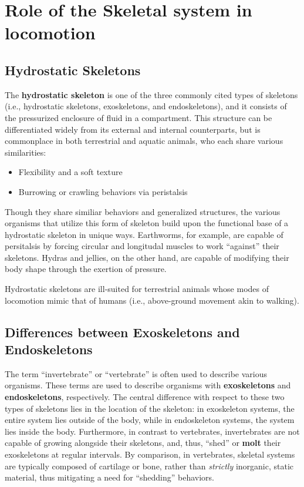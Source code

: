 \documentclass{article}
\begin{document}
\section{Role of the Skeletal system in locomotion}

\subsection{Hydrostatic Skeletons}

The \textbf{hydrostatic skeleton} is one of the three commonly cited types of
skeletons (i.e., hydrostatic skeletons, exoskeletons, and endoskeletons), and it
consists of the pressurized enclosure of fluid in a compartment. This structure
can be differentiated widely from its external and internal counterparts, but is
commonplace in both terrestrial and aquatic animals, who each share various
similarities:

\begin{itemize}
    \item Flexibility and a soft texture
    \item Burrowing or crawling behaviors via peristalsis
\end{itemize}

Though they share similiar behaviors and generalized structures, the various
organisms that utilize this form of skeleton build upon the functional base of
a hydrostatic skeleton in unique ways. Earthworms, for example, are capable of
persitalsis by forcing circular and longitudal muscles to work ``against'' their
skeletons. Hydras and jellies, on the other hand, are capable of modifying their
body shape through the exertion of pressure.

Hydrostatic skeletons are ill-suited for terrestrial animals whose modes of
locomotion mimic that of humans (i.e., above-ground movement akin to walking).

\subsection{Differences between Exoskeletons and Endoskeletons}

The term ``invertebrate'' or ``vertebrate'' is often used to describe various
organisms. These terms are used to describe organisms with \textbf{exoskeletons}
and \textbf{endoskeletons}, respectively. The central difference with respect to
these two types of skeletons lies in the location of the skeleton: in
exoskeleton systems, the entire system lies outside of the body, while in
endoskeleton systems, the system lies inside the body. Furthermore, in contrast
to vertebrates, invertebrates are not capable of growing alongside their
skeletons, and, thus, ``shed'' or \textbf{molt} their exoskeletons at regular
intervals. By comparison, in vertebrates, skeletal systems are typically
composed
of cartilage or bone, rather than \emph{strictly} inorganic, static material,
thus mitigating a need for ``shedding'' behaviors.
\end{document}
